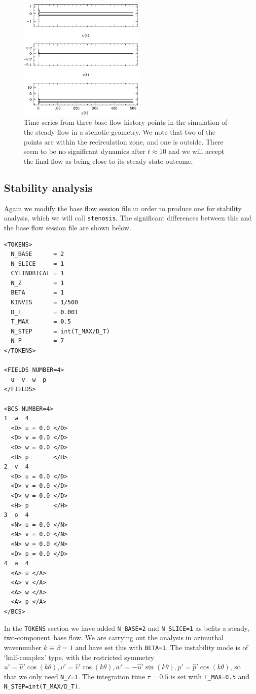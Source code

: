 \documentclass[11pt,a4paper]{report}
\newcommand\twoc{two-com\-po\-nent}
\begin{document}
\begin{figure}
\begin{center}
\includegraphics[width=0.55\textwidth]{StenBaseHis}
\end{center}
\caption{Time series from three base flow history points in the
  simulation of the steady flow in a stenotic geometry. We note that
  two of the points are within the recirculation zone, and one is
  outside.  There seem to be no significant dynamics after
  $t\approx10$ and we will accept the final flow as being close to its
  steady state outcome.}
\label{fig.stenhis}
\end{figure}

\subsection{Stability analysis}

Again we modify the base flow session file in order to produce one for
stability analysis, which we will call \verb+stenosis+.  The
significant differences between this and the base flow session file
are shown below.  
{\small
\begin{verbatim}
<TOKENS>
  N_BASE      = 2
  N_SLICE     = 1
  CYLINDRICAL = 1
  N_Z         = 1
  BETA        = 1
  KINVIS      = 1/500
  D_T         = 0.001
  T_MAX       = 0.5
  N_STEP      = int(T_MAX/D_T)
  N_P         = 7
</TOKENS>

<FIELDS NUMBER=4>
  u  v  w  p
</FIELDS>

<BCS NUMBER=4>
1  w  4
  <D> u = 0.0 </D>
  <D> v = 0.0 </D>
  <D> w = 0.0 </D>
  <H> p       </H>
2  v  4
  <D> u = 0.0 </D>
  <D> v = 0.0 </D>
  <D> w = 0.0 </D>
  <H> p       </H>
3  o  4
  <N> u = 0.0 </N>
  <N> v = 0.0 </N>
  <N> w = 0.0 </N>
  <D> p = 0.0 </D>
4  a  4
  <A> u </A>
  <A> v </A> 
  <A> w </A> 
  <A> p </A>
</BCS>
\end{verbatim}
}
\noindent
In the \verb+TOKENS+ section we have added \verb+N_BASE=2+ and
\verb+N_SLICE=1+ as befits a steady, \twoc\ base flow.  We are
carrying out the analysis in azimuthal wavenumber $k\equiv\beta=1$ and
have set this with \verb+BETA=1+. The instability mode is of
`half-complex' type, with the restricted symmetry
$u'=\hat{u}'\cos(k\theta), v'=\hat{v}'\cos(k\theta),
w'=-\hat{u}'\sin(k\theta), p'=\hat{p}'\cos(k\theta)$, so that we only
need \verb+N_Z=1+.  The integration time $\tau=0.5$ is set with
\verb+T_MAX=0.5+ and \verb+N_STEP=int(T_MAX/D_T)+.
\end{document}
